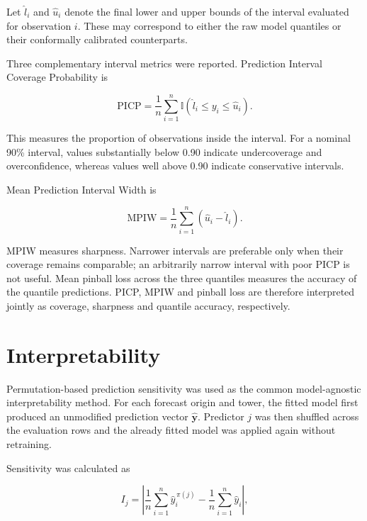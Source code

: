 Let \(\hat{l}_i\) and \(\hat{u}_i\) denote the final lower and upper
bounds of the interval evaluated for observation \(i\). These may correspond
to either the raw model quantiles or their conformally calibrated
counterparts.

Three complementary interval metrics were reported. Prediction Interval
Coverage Probability is

\begin{equation}
\mathrm{PICP}
=
\frac{1}{n}
\sum_{i=1}^{n}
\mathbb{I}
\left(
\hat{l}_i
\leq y_i
\leq
\hat{u}_i
\right).
\end{equation}

This measures the proportion of observations inside the interval. For a nominal
90\% interval, values substantially below 0.90 indicate undercoverage and
overconfidence, whereas values well above 0.90 indicate conservative
intervals.

Mean Prediction Interval Width is

\begin{equation}
\mathrm{MPIW}
=
\frac{1}{n}
\sum_{i=1}^{n}
\left(
\hat{u}_i-\hat{l}_i
\right).
\end{equation}

MPIW measures sharpness. Narrower intervals are preferable only when their
coverage remains comparable; an arbitrarily narrow interval with poor PICP is
not useful. Mean pinball loss across the three quantiles measures the accuracy
of the quantile predictions. PICP, MPIW and pinball loss are
therefore interpreted jointly as coverage, sharpness and quantile accuracy,
respectively.

\section{Interpretability}
\label{sec:interpretability_methods}

Permutation-based prediction sensitivity was used as the common model-agnostic
interpretability method. For each forecast origin and tower, the fitted model
first produced an unmodified prediction vector
\(\hat{\mathbf{y}}\). Predictor \(j\) was then shuffled across the evaluation
rows and the already fitted model was applied again without retraining.

Sensitivity was calculated as

\begin{equation}
I_j
=
\left|
\frac{1}{n}
\sum_{i=1}^{n}
\hat{y}^{\,\pi(j)}_i
-
\frac{1}{n}
\sum_{i=1}^{n}
\hat{y}_i
\right|,
\label{eq:permutation_importance}
\end{equation}

